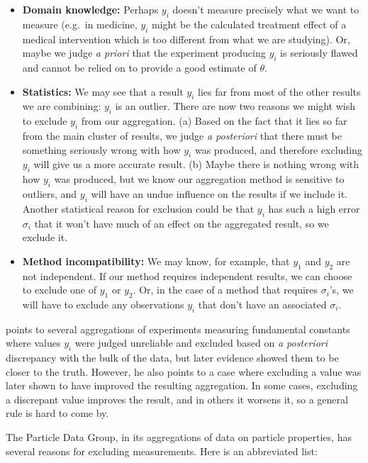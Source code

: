 \documentclass[letterpaper,12pt]{article}
\begin{document}
\begin{itemize}
  \item \textbf{Domain knowledge:} Perhaps $y_i$ doesn't measure precisely what we want to measure (e.g.~in medicine, $y_i$ might be the calculated treatment effect of a medical intervention which is too different from what we are studying). Or, maybe we judge \textit{a priori} that the experiment producing $y_i$ is seriously flawed and cannot be relied on to provide a good estimate of $\theta$.
  \item \textbf{Statistics:} We may see that a result $y_i$ lies far from most of the other results we are combining: $y_i$ is an outlier. There are now two reasons we might wish to exclude $y_i$ from our aggregation. (a) Based on the fact that it lies so far from the main cluster of results, we judge \textit{a posteriori} that there must be something seriously wrong with how $y_i$ was produced, and therefore excluding $y_i$ will give us a more accurate result. (b) Maybe there is nothing wrong with how $y_i$ was produced, but we know our aggregation method is sensitive to outliers, and $y_i$ will have an undue influence on the results if we include it. Another statistical reason for exclusion could be that $y_i$ has such a high error $\sigma_i$ that it won't have much of an effect on the aggregated result, so we exclude it.
  \item \textbf{Method incompatibility:} We may know, for example, that $y_1$ and $y_2$ are not independent. If our method requires independent results, we can choose to exclude one of $y_1$ or $y_2$. Or, in the case of a method that requires $\sigma_i$'s, we will have to exclude any observations $y_i$ that don't have an associated $\sigma_i$.
\end{itemize}

\citet{taylor1982numerical} points to several aggregations of experiments measuring fundamental constants where values $y_i$ were judged unreliable and excluded based on \textit{a posteriori} discrepancy with the bulk of the data, but later evidence showed them to be closer to the truth. However, he also points to a case where excluding a value was later shown to have improved the resulting aggregation. In some cases, excluding a discrepant value improves the result, and in others it worsens it, so a general rule is hard to come by.

The Particle Data Group, in its aggregations of data on particle properties, has several reasons for excluding measurements. Here is an abbreviated list:
\end{document}
